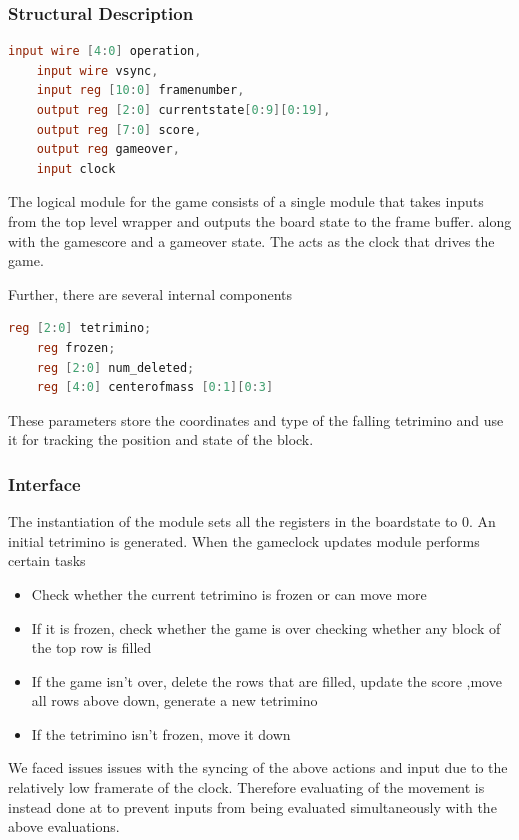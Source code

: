\subsubsection{Structural Description}
\label{subsubsection:Structuraldescr}
\begin{lstlisting}[language=Verilog]
    input wire [4:0] operation,  
    input wire vsync, 
    input reg [10:0] framenumber, 
    output reg [2:0] currentstate[0:9][0:19], 
    output reg [7:0] score,
    output reg gameover,
    input clock
\end{lstlisting}
The logical module for the game consists of a single module that takes inputs from the top level wrapper and outputs the board state to the frame buffer. \newline
along with the gamescore and a gameover state. The  acts as the clock that drives the game.

Further, there are several internal components 
\begin{lstlisting}[language=Verilog]
    reg [2:0] tetrimino;
    reg frozen;
    reg [2:0] num_deleted;
    reg [4:0] centerofmass [0:1][0:3]
\end{lstlisting}
These parameters store the coordinates and type of the falling 
tetrimino and use it for tracking the position and state of the block.\\

\subsubsection{Interface}
\label{subsubsection:interface}
The instantiation of the module sets all the registers in the boardstate to 0. An initial tetrimino is generated.
\newline 
When the gameclock updates module performs certain tasks 
\begin{itemize}
    \item Check whether the current tetrimino is frozen or can move more
    \item If it is frozen, check whether the game is over checking whether any block of the top row is filled
    \item If the game isn't over, delete the rows that are filled, update the score ,move all rows above down, generate a new tetrimino
    \item If the tetrimino isn't frozen, move it down 
\end{itemize}
We faced issues issues with the syncing of the above actions and input due to the relatively low framerate of the clock. 
Therefore evaluating of the movement is instead done at  to prevent inputs 
from being evaluated simultaneously with the above evaluations.
